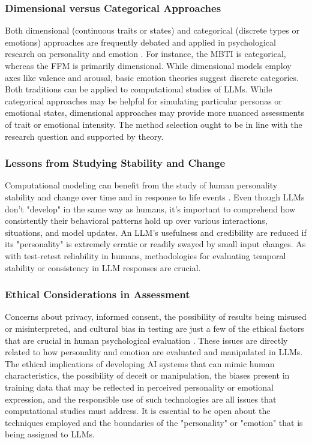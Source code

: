\documentclass{DESSThesis}
\begin{document}
\subsubsection{Dimensional versus Categorical Approaches}
Both dimensional (continuous traits or states) and categorical (discrete types or emotions) approaches are frequently debated and applied in psychological research on personality and emotion \cite{mccrae_reinterpreting_1989,david_watson_panas-x_1994,paul_towards_2020}. For instance, the MBTI is categorical, whereas the FFM is primarily dimensional. While dimensional models employ axes like valence and arousal, basic emotion theories suggest discrete categories. Both traditions can be applied to computational studies of LLMs. While categorical approaches may be helpful for simulating particular personas or emotional states, dimensional approaches may provide more nuanced assessments of trait or emotional intensity. The method selection ought to be in line with the research question and supported by theory.

\subsubsection{Lessons from Studying Stability and Change}
Computational modeling can benefit from the study of human personality stability and change over time and in response to life events \cite{cobb-clark_stability_2012}. Even though LLMs don't "develop" in the same way as humans, it's important to comprehend how consistently their behavioral patterns hold up over various interactions, situations, and model updates. An LLM's usefulness and credibility are reduced if its "personality" is extremely erratic or readily swayed by small input changes. As with test-retest reliability in humans, methodologies for evaluating temporal stability or consistency in LLM responses are crucial.

\subsubsection{Ethical Considerations in Assessment}
Concerns about privacy, informed consent, the possibility of results being misused or misinterpreted, and cultural bias in testing are just a few of the ethical factors that are crucial in human psychological evaluation \cite{kosinski_private_2013}. These issues are directly related to how personality and emotion are evaluated and manipulated in LLMs. The ethical implications of developing AI systems that can mimic human characteristics, the possibility of deceit or manipulation, the biases present in training data that may be reflected in perceived personality or emotional expression, and the responsible use of such technologies are all issues that computational studies must address. It is essential to be open about the techniques employed and the boundaries of the "personality" or "emotion" that is being assigned to LLMs.
\end{document}
